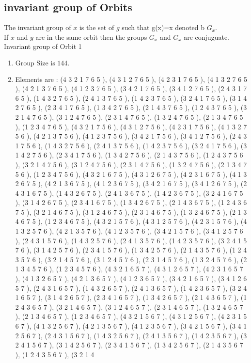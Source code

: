 \documentclass[12pt]{article}
\begin{document}
\subsection{invariant group of Orbits}
\noindent The invariant group of $x$ is the set of $g$ such that g(x)=x denoted b $G_x$.\\
If $x$ and $y$ are in the same orbit then the groups $G_x$ and  $G_x$ are conjuguate.\\
Invariant group of Orbit 1
\begin{enumerate}
\item Group Size is $144$.
\item Elements are : (4 3 2 1 7 6 5  ), (4 3 1 2 7 6 5  ), (4 2 3 1 7 6 5  ), (4 1 3 2 7 6 5  ), (4 2 1 3 7 6 5  ), (4 1 2 3 7 6 5  ), (3 4 2 1 7 6 5  ), (3 4 1 2 7 6 5  ), (2 4 3 1 7 6 5  ), (1 4 3 2 7 6 5  ), (2 4 1 3 7 6 5  ), (1 4 2 3 7 6 5  ), (3 2 4 1 7 6 5  ), (3 1 4 2 7 6 5  ), (2 3 4 1 7 6 5  ), (1 3 4 2 7 6 5  ), (2 1 4 3 7 6 5  ), (1 2 4 3 7 6 5  ), (3 2 1 4 7 6 5  ), (3 1 2 4 7 6 5  ), (2 3 1 4 7 6 5  ), (1 3 2 4 7 6 5  ), (2 1 3 4 7 6 5  ), (1 2 3 4 7 6 5  ), (4 3 2 1 7 5 6  ), (4 3 1 2 7 5 6  ), (4 2 3 1 7 5 6  ), (4 1 3 2 7 5 6  ), (4 2 1 3 7 5 6  ), (4 1 2 3 7 5 6  ), (3 4 2 1 7 5 6  ), (3 4 1 2 7 5 6  ), (2 4 3 1 7 5 6  ), (1 4 3 2 7 5 6  ), (2 4 1 3 7 5 6  ), (1 4 2 3 7 5 6  ), (3 2 4 1 7 5 6  ), (3 1 4 2 7 5 6  ), (2 3 4 1 7 5 6  ), (1 3 4 2 7 5 6  ), (2 1 4 3 7 5 6  ), (1 2 4 3 7 5 6  ), (3 2 1 4 7 5 6  ), (3 1 2 4 7 5 6  ), (2 3 1 4 7 5 6  ), (1 3 2 4 7 5 6  ), (2 1 3 4 7 5 6  ), (1 2 3 4 7 5 6  ), (4 3 2 1 6 7 5  ), (4 3 1 2 6 7 5  ), (4 2 3 1 6 7 5  ), (4 1 3 2 6 7 5  ), (4 2 1 3 6 7 5  ), (4 1 2 3 6 7 5  ), (3 4 2 1 6 7 5  ), (3 4 1 2 6 7 5  ), (2 4 3 1 6 7 5  ), (1 4 3 2 6 7 5  ), (2 4 1 3 6 7 5  ), (1 4 2 3 6 7 5  ), (3 2 4 1 6 7 5  ), (3 1 4 2 6 7 5  ), (2 3 4 1 6 7 5  ), (1 3 4 2 6 7 5  ), (2 1 4 3 6 7 5  ), (1 2 4 3 6 7 5  ), (3 2 1 4 6 7 5  ), (3 1 2 4 6 7 5  ), (2 3 1 4 6 7 5  ), (1 3 2 4 6 7 5  ), (2 1 3 4 6 7 5  ), (1 2 3 4 6 7 5  ), (4 3 2 1 5 7 6  ), (4 3 1 2 5 7 6  ), (4 2 3 1 5 7 6  ), (4 1 3 2 5 7 6  ), (4 2 1 3 5 7 6  ), (4 1 2 3 5 7 6  ), (3 4 2 1 5 7 6  ), (3 4 1 2 5 7 6  ), (2 4 3 1 5 7 6  ), (1 4 3 2 5 7 6  ), (2 4 1 3 5 7 6  ), (1 4 2 3 5 7 6  ), (3 2 4 1 5 7 6  ), (3 1 4 2 5 7 6  ), (2 3 4 1 5 7 6  ), (1 3 4 2 5 7 6  ), (2 1 4 3 5 7 6  ), (1 2 4 3 5 7 6  ), (3 2 1 4 5 7 6  ), (3 1 2 4 5 7 6  ), (2 3 1 4 5 7 6  ), (1 3 2 4 5 7 6  ), (2 1 3 4 5 7 6  ), (1 2 3 4 5 7 6  ), (4 3 2 1 6 5 7  ), (4 3 1 2 6 5 7  ), (4 2 3 1 6 5 7  ), (4 1 3 2 6 5 7  ), (4 2 1 3 6 5 7  ), (4 1 2 3 6 5 7  ), (3 4 2 1 6 5 7  ), (3 4 1 2 6 5 7  ), (2 4 3 1 6 5 7  ), (1 4 3 2 6 5 7  ), (2 4 1 3 6 5 7  ), (1 4 2 3 6 5 7  ), (3 2 4 1 6 5 7  ), (3 1 4 2 6 5 7  ), (2 3 4 1 6 5 7  ), (1 3 4 2 6 5 7  ), (2 1 4 3 6 5 7  ), (1 2 4 3 6 5 7  ), (3 2 1 4 6 5 7  ), (3 1 2 4 6 5 7  ), (2 3 1 4 6 5 7  ), (1 3 2 4 6 5 7  ), (2 1 3 4 6 5 7  ), (1 2 3 4 6 5 7  ), (4 3 2 1 5 6 7  ), (4 3 1 2 5 6 7  ), (4 2 3 1 5 6 7  ), (4 1 3 2 5 6 7  ), (4 2 1 3 5 6 7  ), (4 1 2 3 5 6 7  ), (3 4 2 1 5 6 7  ), (3 4 1 2 5 6 7  ), (2 4 3 1 5 6 7  ), (1 4 3 2 5 6 7  ), (2 4 1 3 5 6 7  ), (1 4 2 3 5 6 7  ), (3 2 4 1 5 6 7  ), (3 1 4 2 5 6 7  ), (2 3 4 1 5 6 7  ), (1 3 4 2 5 6 7  ), (2 1 4 3 5 6 7  ), (1 2 4 3 5 6 7  ), (3 2 1 4 
\end{enumerate}
\end{document}
